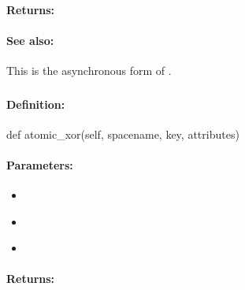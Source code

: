 \paragraph{Returns:}


\paragraph{See also:}  This is the asynchronous form of .

\pagebreak
\subsubsection{}
\label{api:python:atomic_xor}


\paragraph{Definition:}
\begin{pythoncode}
def atomic_xor(self, spacename, key, attributes)
\end{pythoncode}

\paragraph{Parameters:}
\begin{itemize}[noitemsep]
\item {}\\

\item {}\\

\item {}\\

\end{itemize}

\paragraph{Returns:}


\pagebreak
\subsubsection{}
\label{api:python:async_atomic_xor}


